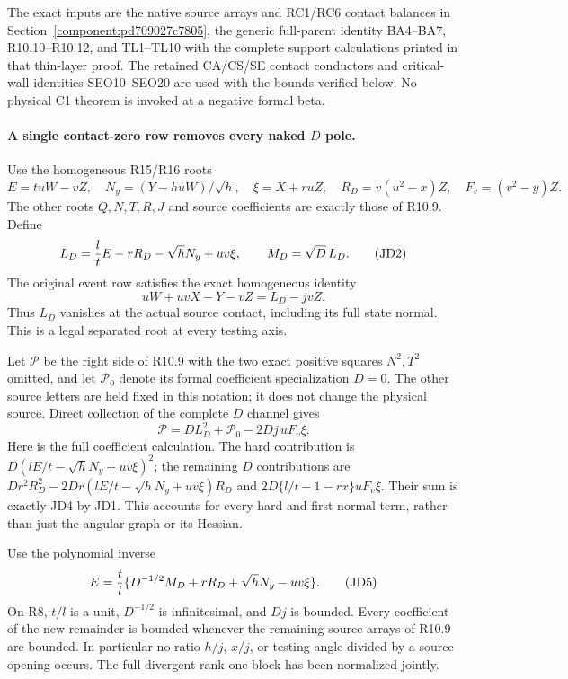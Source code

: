 The exact inputs are the native source arrays and RC1/RC6 contact
balances in Section~\ref{component:pd709027c7805}, the generic full-parent
identity BA4--BA7, R10.10--R10.12, and TL1--TL10 with the complete
support calculations printed in that thin-layer proof. The retained
CA/CS/SE contact conductors and critical-wall identities SEO10--SEO20
are used with the bounds verified below. No physical C1 theorem is
invoked at a negative formal beta.

\paragraph{A single contact-zero row removes every naked $D$ pole.}
Use the homogeneous R15/R16 roots
\[
 E=tuW-vZ,\quad N_y=(Y-huW)/\sqrt h,\quad \xi=X+ruZ,
 \quad R_D=v(u^2-x)Z,\quad F_v=(v^2-y)Z.
\]
The other roots $Q,N,T,R,J$ and source coefficients are exactly those
of R10.9.  Define
\[
 L_D={l\over t}E-rR_D-\sqrt hN_y+uv\xi,
 \qquad M_D=\sqrt D\,L_D.                            \tag{JD2}
\]
The original event row satisfies the exact homogeneous identity
\[
 uW+uvX-Y-vZ=L_D-jvZ.                               \tag{JD3}
\]
Thus $L_D$ vanishes at the actual source contact, including its full
state normal.  This is a legal separated root at every testing axis.

Let $\mathscr P$ be the right side of R10.9 with the two exact
positive squares $N^2,T^2$ omitted, and let $\mathscr P_0$ denote
its formal coefficient specialization $D=0$.  The other source
letters are held fixed in this notation; it does not change the
physical source.  Direct collection of the complete $D$ channel gives
\[
 \boxed{\quad \mathscr P=D L_D^2+\mathscr P_0
                        -2Dj\,uF_v\xi.\quad}        \tag{JD4}
\]
Here is the full coefficient calculation.  The hard contribution is
$D(lE/t-\sqrt hN_y+uv\xi)^2$; the remaining $D$ contributions are
$Dr^2R_D^2-2Dr(lE/t-\sqrt hN_y+uv\xi)R_D$ and
$2D\{l/t-1-rx\}uF_v\xi$.  Their sum is exactly JD4 by JD1.
This accounts for every hard and first-normal term, rather than just
the angular graph or its Hessian.

Use the polynomial inverse
\[
 E={t\over l}\{D^{-1/2}M_D+rR_D+\sqrt hN_y-uv\xi\}. \tag{JD5}
\]
On R8, $t/l$ is a unit, $D^{-1/2}$ is infinitesimal, and $Dj$ is
bounded.  Every coefficient of the new remainder is bounded whenever
the remaining source arrays of R10.9 are bounded.  In particular no
ratio $h/j$, $x/j$, or testing angle divided by a source opening occurs.
The full divergent rank-one block has been normalized jointly.

